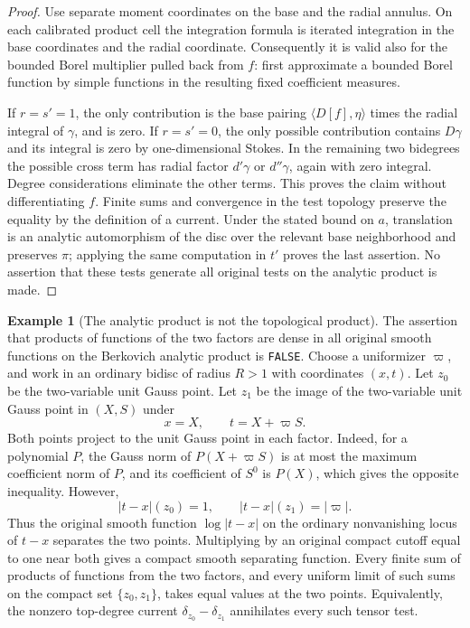 \documentclass[11pt,a4paper]{article}
\numberwithin{equation}{section}
\theoremstyle{definition}
\newtheorem{example}[theorem]{Example}
\theoremstyle{remark}
\begin{document}
\begin{proof}
Use separate moment coordinates on the base and the radial annulus.
On each calibrated product cell the integration formula is iterated
integration in the base coordinates and the radial coordinate.
Consequently it is valid also for the bounded Borel multiplier pulled
back from $f$: first approximate a bounded Borel function by simple
functions in the resulting fixed coefficient measures.

If $r=s'=1$, the only contribution is the base pairing
$\langle D[f],\eta\rangle$ times the radial integral of $\gamma$,
and is zero. If $r=s'=0$, the only possible contribution contains
$D\gamma$ and its integral is zero by one-dimensional Stokes. In
the remaining two bidegrees the possible cross term has radial
factor $d'\gamma$ or $d''\gamma$, again with zero integral.
Degree considerations eliminate the other terms. This proves the
claim without differentiating $f$. Finite sums and convergence in
the test topology preserve the equality by the definition of a
current. Under the stated bound on $a$, translation is an analytic
automorphism of the disc over the relevant base neighborhood and
preserves $\pi$; applying the same computation in $t'$ proves the
last assertion. No assertion that these tests generate all original
tests on the analytic product is made.
\end{proof}

\begin{example}[The analytic product is not the topological product]
\label{ex:r3-analytic-product-not-topological-product}
The assertion that products of functions of the two factors are
dense in all original smooth functions on the Berkovich analytic
product is \texttt{FALSE}.
Choose a uniformizer $\varpi$, and work in an ordinary bidisc of
radius $R>1$ with coordinates $(x,t)$. Let $z_0$ be the two-variable
unit Gauss point. Let $z_1$ be the image of the two-variable unit
Gauss point in $(X,S)$ under
\[
 x=X,\qquad t=X+\varpi S.
\]
Both points project to the unit Gauss point in each factor. Indeed,
for a polynomial $P$, the Gauss norm of $P(X+\varpi S)$ is at most
the maximum coefficient norm of $P$, and its coefficient of $S^0$
is $P(X)$, which gives the opposite inequality. However,
\[
 |t-x|(z_0)=1,\qquad |t-x|(z_1)=|\varpi|.
\]
Thus the original smooth function $\log|t-x|$ on the ordinary
nonvanishing locus of $t-x$ separates the two points. Multiplying by an
original compact cutoff equal to one near both gives a compact
smooth separating function. Every finite sum of products of
functions from the two factors, and every uniform limit of such
sums on the compact set $\{z_0,z_1\}$, takes equal values at the
two points. Equivalently, the nonzero top-degree current
$\delta_{z_0}-\delta_{z_1}$ annihilates every such tensor test.
\end{example}
\end{document}
